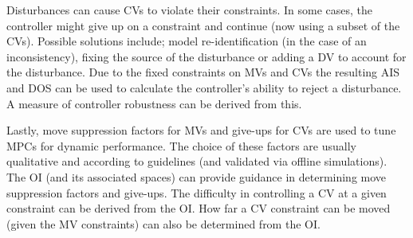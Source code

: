 Disturbances can cause CVs to violate their constraints. 
In some cases, the controller might give up on a constraint and continue (now using a subset of the CVs).
Possible solutions include; model re-identification (in the case of an inconsistency), fixing the source of the disturbance or adding a DV to account for the disturbance.
Due to the fixed constraints on MVs and CVs the resulting AIS and DOS can be used to calculate the controller's ability to reject a disturbance. 
A measure of controller robustness can be derived from this.
    
Lastly, move suppression factors for MVs and give-ups for CVs are used to tune MPCs for dynamic performance.
The choice of these factors are usually qualitative and according to guidelines (and validated via offline simulations).
The OI (and its associated spaces) can provide guidance in determining move suppression factors and give-ups. 
The difficulty in controlling a CV at a given constraint can be derived from the OI.
How far a CV constraint can be moved (given the MV constraints) can also be determined from the OI.

